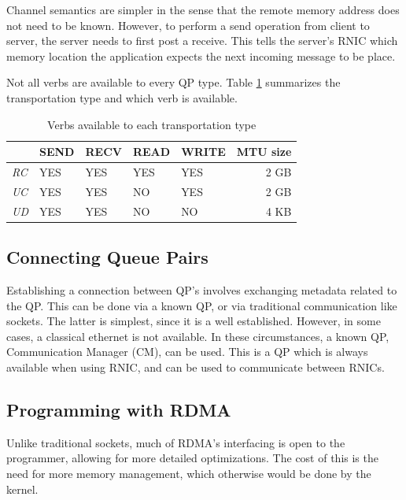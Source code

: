 Channel semantics are simpler in the sense that the remote memory address does not need to be known.
However, to perform a send operation from client to server, the server needs to first post a receive.
This tells the server's RNIC which memory location the application expects the next incoming message to be place.

Not all verbs are available to every QP type. Table \ref{tab:transport-verb} summarizes the transportation type and which verb is available.

\begin{table}
    \centering
    \begin{tabular}{lllllr}
        \toprule
          & \textbf{SEND} & \textbf{RECV} & \textbf{READ} & \textbf{WRITE} & \textbf{MTU size} \\
        \midrule
        \textit{RC} & YES & YES & YES & YES & 2 GB \\
        \textit{UC} & YES & YES & NO & YES & 2 GB \\
        \textit{UD} & YES & YES & NO & NO & 4 KB \\
        \bottomrule
    \end{tabular}
    \caption{Verbs available to each transportation type}
    \label{tab:transport-verb}
\end{table}

\subsection{Connecting Queue Pairs}\label{subsec:connecting-qp's}
Establishing a connection between QP's involves exchanging metadata related to the QP.
This can be done via a known QP, or via traditional communication like sockets.
The latter is simplest, since it is a well established.
However, in some cases, a classical ethernet is not available.
In these circumstances, a known QP, Communication Manager (CM), can be used.
This is a QP which is always available when using RNIC, and can be used to communicate between RNICs.

\subsection{Programming with RDMA}\label{subsec:programming-with-rdma}
Unlike traditional sockets, much of RDMA's interfacing is open to the programmer, allowing for more detailed optimizations.
The cost of this is the need for more memory management, which otherwise would be done by the kernel.

